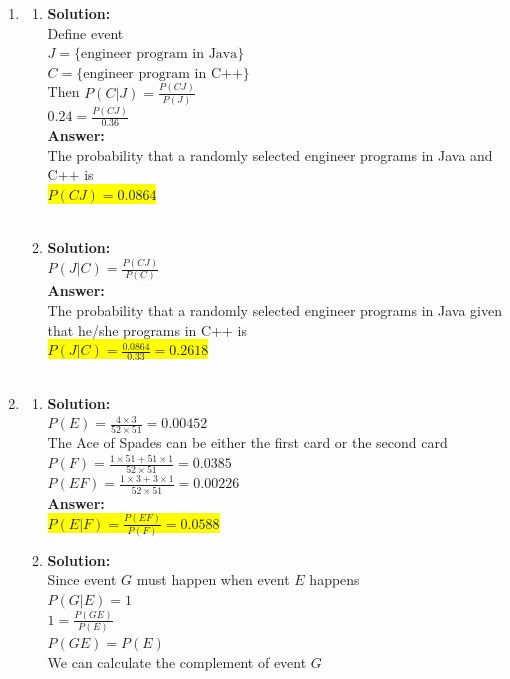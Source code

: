 \documentclass{article}
\newcommand{\myansw}{\textbf{Answer:}\\}
\newcommand{\mysolu}{\textbf{Solution:}\\}
\begin{document}
\thispagestyle{fancy} %

\begin{enumerate}
	\item
	\begin{enumerate}
		\item
		\mysolu
		Define event\\
		${J = \{\text{engineer program in Java}\}}$\\
		${C = \{\text{engineer program in C++}\}}$\\
		Then
		${P(C|J)=\frac{P(CJ)}{P(J)}}$\\
		${0.24=\frac{P(CJ)}{0.36}}$\\
		\myansw
		The probability that a randomly selected engineer programs in Java and C++ is\\
		\colorbox{yellow}{
			${P(CJ)=0.0864}$\\
		}\\
		\item
		\mysolu
		${P(J|C)=\frac{P(CJ)}{P(C)}}$\\
		\myansw
		The probability that a randomly selected engineer programs in Java given that he/she programs in C++ is\\
		\colorbox{yellow}{
			${P(J|C)=\frac{0.0864}{0.33}=0.2618}$\\
		}\\
	\end{enumerate}
	\item
	\begin{enumerate}
		\item 
		\mysolu
		${P(E)=\frac{4\times 3}{52 \times 51}=0.00452}$\\
		The Ace of Spades can be either the first card or the second card\\
		${P(F)=\frac{1\times 51 + 51 \times 1}{52 \times 51}=0.0385}$\\
		${P(EF)=\frac{1\times 3 + 3 \times 1}{52 \times 51}=0.00226}$\\
		\myansw
		\colorbox{yellow}{${P(E|F)=\frac{P(EF)}{P(F)}=0.0588}$}\\
		\item 
		\mysolu
		Since event ${G}$ must happen when event ${E}$ happens\\
		${P(G|E)=1}$\\
		${1=\frac{P(GE)}{P(E)}}$\\
		${P(GE)=P(E)}$\\
		We can calculate the complement of event ${G}$\\

\end{enumerate}
\end{enumerate}
\end{document}
